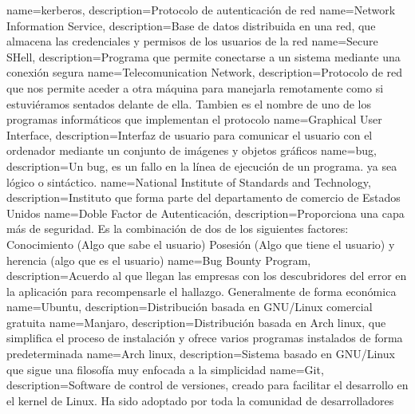 {
	name=kerberos,
	description={Protocolo de autenticación de red}
}
{
	name=Network Information Service,
	description={Base de datos distribuida en una red, que almacena las credenciales y permisos de los usuarios de la red}
}
{
	name=Secure SHell,
	description={Programa que permite conectarse a un sistema mediante una conexión segura}
}
{
	name=Telecomunication Network,
	description={Protocolo de red que nos permite aceder a otra máquina para manejarla remotamente como si estuviéramos sentados delante de ella. Tambien es el nombre de uno de los programas informáticos que implementan el protocolo}
}
{
	name=Graphical User Interface,
	description={Interfaz de usuario para comunicar el usuario con el ordenador mediante un conjunto de imágenes y objetos gráficos}
}
{
	name=bug,
	description={Un bug, es un fallo en la línea de ejecución de un programa. ya sea lógico o sintáctico.}
}
{
	name=National Institute of Standards and Technology,
	description={Instituto que forma parte del departamento de comercio de Estados Unidos}
}
{
	name=Doble Factor de Autenticación,
	description={Proporciona una capa más de seguridad. Es la combinación de dos de los siguientes factores: Conocimiento (Algo que sabe el usuario) Posesión (Algo que tiene el usuario) y herencia (algo que es el usuario)}
}
{
	name=Bug Bounty Program,
	description={Acuerdo al que llegan las empresas con los descubridores del error en la aplicación para recompensarle el hallazgo. Generalmente de forma económica}
}
{
	name=Ubuntu,
	description={Distribución basada en GNU/Linux comercial gratuita}
}
{
	name=Manjaro,
	description={Distribución basada en Arch linux, que simplifica el proceso de instalación y ofrece varios programas instalados de forma predeterminada}
}
{
	name=Arch linux,
	description={Sistema basado en GNU/Linux que sigue una filosofía muy enfocada a la simplicidad}
}
{
	name=Git,
	description={Software de control de versiones, creado para facilitar el desarrollo en el kernel de Linux. Ha sido adoptado por toda la comunidad de desarrolladores}
}
